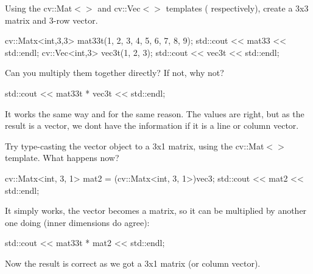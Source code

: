 \begin{DoxyEnumerate}
\item Using the {\ttfamily cv\+::\+Mat$<$$>$} and {\ttfamily cv\+::\+Vec$<$$>$} templates ( respectively), create a 3x3 matrix and 3-\/row vector. 
\begin{DoxyCodeInclude}
    cv::Matx<int,3,3> mat33t(1, 2, 3, 4, 5, 6, 7, 8, 9);
    std::cout << mat33 << std::endl;
    cv::Vec<int,3> vec3t(1, 2, 3);
    std::cout << vec3t << std::endl;    
\end{DoxyCodeInclude}

\item Can you multiply them together directly? If not, why not? 
\begin{DoxyCodeInclude}
    std::cout << mat33t * vec3t << std::endl;
\end{DoxyCodeInclude}
 It works the same way and for the same reason. The values are right, but as the result is a vector, we don\textquotesingle{}t have the information if it is a line or column vector.
\item Try type-\/casting the vector object to a 3x1 matrix, using the {\ttfamily cv\+::\+Mat$<$$>$} template. What happens now? 
\begin{DoxyCodeInclude}
    cv::Matx<int, 3, 1> mat2 = (cv::Matx<int, 3, 1>)vec3;
    std::cout << mat2 << std::endl;
\end{DoxyCodeInclude}
It simply works, the vector becomes a matrix, so it can be multiplied by another one doing (inner dimensions do agree)\+: 
\begin{DoxyCodeInclude}
    std::cout << mat33t * mat2 << std::endl;
\end{DoxyCodeInclude}
Now the result is correct as we got a 3x1 matrix (or column vector). 
\end{DoxyEnumerate}